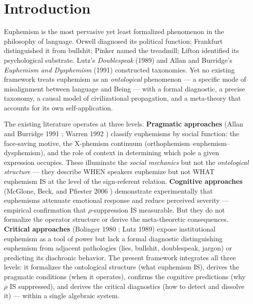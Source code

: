 \documentclass[11pt, oneside]{article}
\theoremstyle{definition}
\begin{document}
\section{Introduction}

Euphemism is the most pervasive yet least formalized phenomenon in the philosophy of language. Orwell \cite{orwell} diagnosed its political function; Frankfurt \cite{frankfurt} distinguished it from bullshit; Pinker \cite{pinker} named the treadmill; Lifton \cite{lifton} identified its psychological substrate. Lutz's \textit{Doublespeak} (1989) and Allan and Burridge's \textit{Euphemism and Dysphemism} (1991) constructed taxonomies. Yet no existing framework treats euphemism as an \textit{ontological} phenomenon --- a specific mode of misalignment between language and Being --- with a formal diagnostic, a precise taxonomy, a causal model of civilizational propagation, and a meta-theory that accounts for its own self-application.

The existing literature operates at three levels. \textbf{Pragmatic approaches} (Allan and Burridge 1991 \cite{allanburridge}; Warren 1992 \cite{warren}) classify euphemisms by social function: the face-saving motive, the X-phemism continuum (orthophemism--euphemism--dysphemism), and the role of context in determining which pole a given expression occupies. These illuminate the \textit{social mechanics} but not the \textit{ontological structure} --- they describe WHEN speakers euphemize but not WHAT euphemism IS at the level of the sign-referent relation. \textbf{Cognitive approaches} (McGlone, Beck, and Pfiester 2006 \cite{mcglone}) demonstrate experimentally that euphemisms attenuate emotional response and reduce perceived severity --- empirical confirmation that $\rho$-suppression IS measurable. But they do not formalize the operator structure or derive the meta-theoretic consequences. \textbf{Critical approaches} (Bolinger 1980 \cite{bolinger}; Lutz 1989) expose institutional euphemism as a tool of power but lack a formal diagnostic distinguishing euphemism from adjacent pathologies (lies, bullshit, doublespeak, jargon) or predicting its diachronic behavior. The present framework integrates all three levels: it formalizes the ontological structure (what euphemism IS), derives the pragmatic conditions (when it operates), confirms the cognitive predictions (why $\rho$ IS suppressed), and derives the critical diagnostics (how to detect and dissolve it) --- within a single algebraic system.
\end{document}
